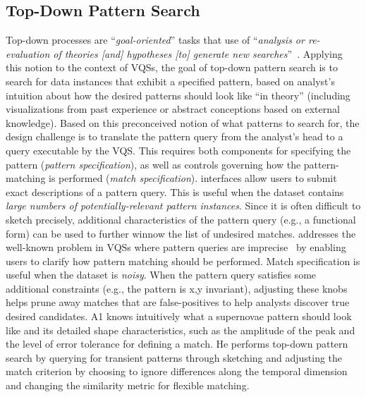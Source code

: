   \subsection{Top-Down Pattern Search}
   Top-down processes are ``\textit{goal-oriented}'' tasks that  use of ``\textit{analysis or re-evaluation of theories [and] hypotheses [to] generate new searches}''~\cite{Pirolli}. Applying this notion to the context of VQSs, the goal of top-down pattern search is to search for data instances that exhibit a specified pattern, based on analyst's intuition about how the desired patterns should look like ``in theory'' (including visualizations from past experience or abstract conceptions based on external knowledge). Based on this preconceived notion of what patterns to search for, the design challenge is to translate the pattern query from the analyst's head to a query executable by the VQS. This requires both components for specifying the pattern (\textit{pattern specification}), as well as controls governing how the pattern-matching is performed (\textit{match specification}).
    interfaces allow users to submit exact descriptions of a pattern query. This is useful when the dataset contains \emph{large numbers of potentially-relevant pattern instances}.
   Since it is often difficult to sketch precisely, additional  characteristics of the pattern query (e.g.,  a functional form) can be used to further winnow the list of undesired matches.%
    addresses the well-known problem in VQSs where pattern queries are imprecise~\cite{correll2016semantics,Holz2009,Eichmann2015} by enabling users to clarify how pattern matching should be performed. Match specification is useful when the dataset is \emph{noisy}. When the pattern query satisfies some additional constraints (e.g., the pattern is x,y invariant), adjusting these knobs helps prune away matches that are false-positives to help analysts discover true desired candidates.
    A1 knows intuitively what a supernovae pattern should look like and its detailed shape characteristics, such as the amplitude of the peak and the level of error tolerance for defining a match. He performs top-down pattern search by querying for transient patterns through sketching and adjusting the match criterion by choosing to ignore differences along the temporal dimension and changing the similarity metric for flexible matching.
